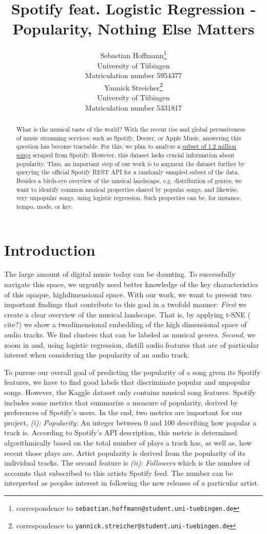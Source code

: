 \documentclass{article}
\title{Spotify feat. Logistic Regression - \\ Popularity, Nothing Else Matters}
\author{%
  Sebastian Hoffmann\thanks{correspondence to \texttt{sebastian.hoffmann@student.uni-tuebingen.de}}\\
  University of Tübingen\\
  Matriculation number 5954377\\
  \And
  Yannick Streicher\thanks{correspondence to \texttt{yannick.streicher@student.uni-tuebingen.de}}\\
  University of Tübingen\\
  Matriculation number 5331817\\
}
\newcommand{\todo}[1]{{\color{red} #1}}
\begin{document}
\maketitle

\begin{abstract}
  What is the musical taste of the world? With the recent rise and global pervasiveness of music streaming services, such as Spotify, Deezer, or Apple Music, answering this question has become tractable. For this, we plan to analyze a \href{https://www.kaggle.com/rodolfofigueroa/spotify-12m-songs}{subset of 1.2 million songs} scraped from Spotify. However, this dataset lacks crucial information about popularity. Thus, an important step of our work is to augment the dataset further by querying the official Spotify REST API for a randomly sampled subset of the data. Besides a birds-eye overview of the musical landscape, e.g. distribution of genres, we want to identify common musical properties shared by popular songs, and likewise, very unpopular songs, using logistic regression. Such properties can be, for instance, tempo, mode, or key.
\end{abstract}

\section{Introduction}
The large amount of digital music today can be daunting. To successfully navigate this space, we urgently need better knowledge of the key characteristics of this opaque, highdimensional space. With our work, we want to present two important findings that contribute to this goal in a twofold manner: \textit{First} we create a clear overview of the musical landscape. That is, by applying t-SNE (\todo{cite?}) we show a twodimensional embedding of the high dimensional space of audio tracks. We find clusters that can be labeled as musical \textit{genres}. \textit{Second}, we zoom in and, using logistic regression, distill audio features that are of particular interest when considering the popularity of an audio track.

To pursue our overall goal of predicting the popularity of a song given its Spotify features, we have to find good labels that discriminate popular and unpopular songs. However, the Kaggle dataset only contains musical song features. Spotify includes some metrics that summarize a measure of popularity, derived by preferences of Spotify's users. In the end, two metrics are important for our project, \textit{(i): Popularity:} An integer between 0 and 100 describing how popular a track is. According to Spotify's API description, this metric is determined algorithmically based on the total number of plays a track has, as well as, how recent those plays are. Artist popularity is derived from the popularity of its individual tracks. The second feature is \textit{(ii): Followers} which is the number of accounts that subscribed to this artists Spotify feed. The number can be interpreted as peoples interest in following the new releases of a particular artist.
\end{document}
